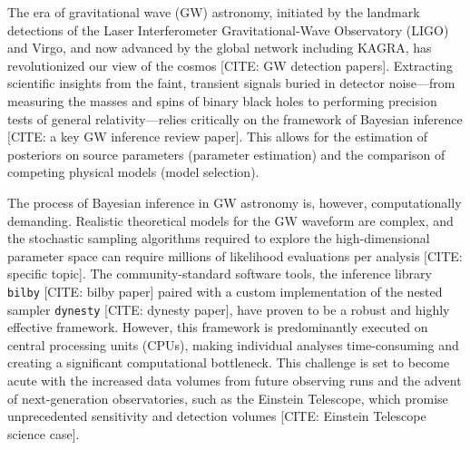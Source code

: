\documentclass[fleqn,usenatbib]{mnras}
\begin{document}


The era of gravitational wave (GW) astronomy, initiated by the landmark
detections of the Laser Interferometer Gravitational-Wave Observatory (LIGO) and
Virgo, and now advanced by the global network including KAGRA, has revolutionized
our view of the cosmos [CITE: GW detection papers]. Extracting scientific insights
from the faint, transient signals buried in detector noise—from measuring the
masses and spins of binary black holes to performing precision tests of general
relativity—relies critically on the framework of Bayesian inference [CITE: a key
GW inference review paper]. This allows for the estimation of posteriors on source parameters
(parameter estimation) and the comparison of competing physical models (model selection).

The process of Bayesian inference in GW astronomy is, however, computationally
demanding. Realistic theoretical models for the GW waveform are complex, and the
stochastic sampling algorithms required to explore the high-dimensional parameter
space can require millions of likelihood evaluations per analysis [CITE: specific
topic]. The community-standard software tools, the inference library \texttt{bilby} [CITE:
bilby paper] paired with a custom implementation of the nested sampler \texttt{dynesty} [CITE:
dynesty paper], have proven to be a robust and highly effective framework.
However, this framework is predominantly executed on central processing units
(CPUs), making individual analyses time-consuming and creating a significant
computational bottleneck. This challenge is set to become acute with the
increased data volumes from future observing runs and the advent of
next-generation observatories, such as the Einstein Telescope, which promise
unprecedented sensitivity and detection volumes [CITE: Einstein Telescope
science case].
\end{document}
